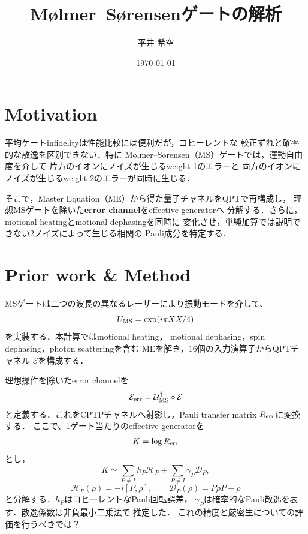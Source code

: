 \documentclass[dvipdfmx,a4paper,10pt,twocolumn]{jsarticle}
\begin{document}
\title{\vspace{-2em}
M{\o}lmer--S{\o}rensenゲートの解析
\vspace{-1em}}
\author{平井 希空}
\date{\today}
\maketitle
\vspace{-3em}

\section{Motivation}

平均ゲートinfidelityは性能比較には便利だが，コヒーレントな
較正ずれと確率的な散逸を区別できない．特に
M{\o}lmer--S{\o}rensen（MS）ゲートでは，運動自由度を介して
片方のイオンにノイズが生じるweight-1のエラーと
両方のイオンにノイズが生じるweight-2のエラーが同時に生じる．

そこで，Master Equation（ME）から得た量子チャネルをQPTで再構成し，
理想MSゲートを除いた\textbf{error channel}をeffective generatorへ
分解する．さらに，motional heatingとmotional dephasingを同時に
変化させ，単純加算では説明できない2ノイズによって生じる相関の
Pauli成分を特定する．

\section{Prior work \& Method}

MSゲートは二つの波長の異なるレーザーにより振動モードを介して、
\begin{equation}
 U_{\rm MS}=\exp(i\pi XX/4)
\end{equation}
を実装する\cite{MS}．本計算ではmotional heating，
motional dephasing，spin dephasing，photon scatteringを含む
MEを解き，16個の入力演算子からQPTチャネル
$\mathcal E$を構成する\cite{QPT}．

理想操作を除いたerror channelを
\begin{equation}
 \mathcal E_{\rm err}
 =\mathcal U_{\rm MS}^{\dagger}\circ\mathcal E
 \label{eq:error_channel}
\end{equation}
と定義する．これをCPTPチャネルへ射影し，Pauli transfer matrix
$R_{\rm err}$に変換する．
ここで、1ゲート当たりのeffective generatorを
\begin{equation}
 K=\log R_{\rm err}
\end{equation}
とし，
\begin{equation}
 K\simeq
 \sum_{P\ne I}h_P\mathcal H_P
 +\sum_{P\ne I}\gamma_P\mathcal D_P ,
 \label{eq:generator}
\end{equation}
\begin{equation}
 \mathcal H_P(\rho)=-i[P,\rho],\qquad
 \mathcal D_P(\rho)=P\rho P-\rho
\end{equation}
と分解する\cite{GST}．$h_P$はコヒーレントなPauli回転誤差，
$\gamma_P$は確率的なPauli散逸を表す．散逸係数は非負最小二乗法で
推定した．
これの精度と厳密生についての評価を行うべきでは？
\end{document}
